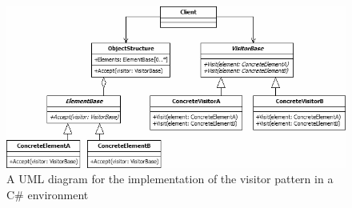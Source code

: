 \begin{figure}[h!]
\centering
 \includegraphics[width=1\textwidth]{figures/VisitorPattern.png} %
\caption{A UML diagram for the implementation of the visitor pattern in a C\# environment}\label{image:visitor}
\vspace{-15pt}
\end{figure}


